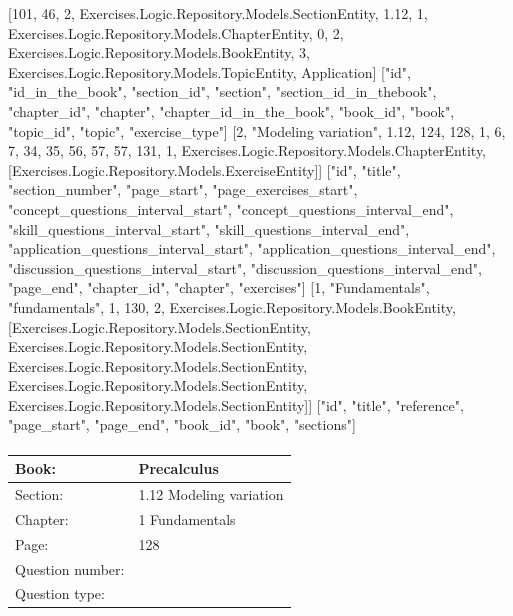 \documentclass{article}
\begin{document}
    [101, 46, 2, Exercises.Logic.Repository.Models.SectionEntity, 1.12, 1, Exercises.Logic.Repository.Models.ChapterEntity, 0, 2, Exercises.Logic.Repository.Models.BookEntity, 3, Exercises.Logic.Repository.Models.TopicEntity, Application]
    ["id", "id_in_the_book", "section_id", "section", "section_id_in_thebook", "chapter_id", "chapter", "chapter_id_in_the_book", "book_id", "book", "topic_id", "topic", "exercise_type"]
    [2, "Modeling variation", 1.12, 124, 128, 1, 6, 7, 34, 35, 56, 57, 57, 131, 1, Exercises.Logic.Repository.Models.ChapterEntity, [Exercises.Logic.Repository.Models.ExerciseEntity]]
    ["id", "title", "section_number", "page_start", "page_exercises_start", "concept_questions_interval_start", "concept_questions_interval_end", "skill_questions_interval_start", "skill_questions_interval_end", "application_questions_interval_start", "application_questions_interval_end", "discussion_questions_interval_start", "discussion_questions_interval_end", "page_end", "chapter_id", "chapter", "exercises"]
    [1, "Fundamentals", "fundamentals", 1, 130, 2, Exercises.Logic.Repository.Models.BookEntity, [Exercises.Logic.Repository.Models.SectionEntity, Exercises.Logic.Repository.Models.SectionEntity, Exercises.Logic.Repository.Models.SectionEntity, Exercises.Logic.Repository.Models.SectionEntity, Exercises.Logic.Repository.Models.SectionEntity]]
    ["id", "title", "reference", "page_start", "page_end", "book_id", "book", "sections"]

   \paragraph{}
   \begin{tabularx}{1\textwidth}{
           p{}
           p{}
       }
       \toprule
       Book: & Precalculus
       \\
       \midrule
       Section: & 1.12 Modeling variation
       \\
       \midrule
       Chapter: & 1 Fundamentals
       \\
       \midrule
       Page: & 128
       \\
       \midrule
       Question number: & 
       \\
       \midrule
       Question type: & 
       \\
       \bottomrule
   \end{tabularx}
\end{document}
